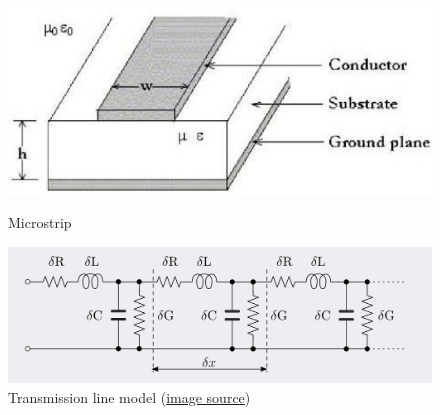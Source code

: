 \documentclass[final]{cubedoc}
\begin{document}
	
	
	
	
	\begin{figure}[h!]
		\centering
		\begin{minipage}[b]{0.4\textwidth}
			\includegraphics[width=\textwidth]{assets/microstrip.jpg}
			\caption{Microstrip \cite{microstrip}}
		\end{minipage}
		\hfill
		\begin{minipage}[b]{0.4\textwidth}
			\includegraphics[width=\textwidth]{assets/distributed_model.png}
			\caption{Transmission line model \small{(\href{https://web.archive.org/web/20200814091245/https://en.wikipedia.org/wiki/Primary_line_constants}{image source})}}
		\end{minipage}
	\end{figure}
	
\end{document}
